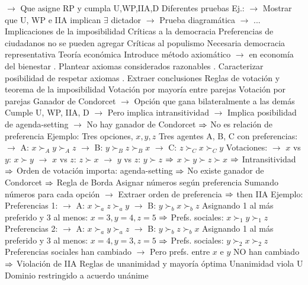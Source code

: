 \documentclass{nuevotema}
\begin{document}
\begin{esquemal}
				\4[] $\to$ Que asigne RP y cumpla U,WP,IIA,D
				\4 Diferentes pruebas
				\4[] Ej.:
				\4[] $\to$ Mostrar que U, WP e IIA implican $\exists$ dictador
				\4[] $\to$ Prueba diagramática
				\4[] $\to$ ...
			\3 Implicaciones de la imposibilidad
				\4 Críticas a la democracia
				\4[] Preferencias de ciudadanos no se pueden agregar
				\4 Críticas al populismo
				\4[] Necesaria democracia representativa
				\4 Teoría económica
				\4[] Introduce método axiomático
				\4[] $\to$ en economía del bienestar
				. Plantear axiomas considerados razonables
				. Caracterizar posibilidad de respetar axiomas
				. Extraer conclusiones
		\2 Reglas de votación y teorema de la imposibilidad
			\3 Votación por mayoría entre parejas
				\4 Votación por parejas
				\4[] Ganador de Condorcet
				\4[] $\to$ Opción que gana bilateralmente a las demás
				\4[] Cumple U, WP, IIA, D
				\4[] $\to$ Pero implica intransitividad
				\4[] $\to$ Implica posibilidad de agenda-setting
				\4[] $\to$ No hay ganador de Condorcet
				\4[] $\Rightarrow$ No es relación de preferencia
				\4 Ejemplo:
				\4[] Tres opciones, $x, y, z$
				\4[] Tres agentes A, B, C con preferencias:
				\4[] $\to$ A: $x \succ_A y \succ_A z$
				\4[] $\to$ B: $y \succ_B z \succ_B x$
				\4[] $\to$ C: $z \succ_C x \succ_C y$
				\4[] Votaciones:
				\4[] $\to$ $x$ vs $y$: $x \succ y$
				\4[] $\to$ $x$ vs $z$: $z \succ x$
				\4[] $\to$ $y$ vs $z$: $y \succ z$
				\4[] $\Rightarrow$ $x \succ y \succ z \succ x$
				\4[] $\Rightarrow$ Intransitividad
				\4[] $\Rightarrow$ Orden de votación importa: agenda-setting
				\4[] $\Rightarrow$ No existe ganador de Condorcet
				\4[] $\Rightarrow$ 
			\3 Regla de Borda
				\4 Asignar números según preferencia
				\4[] Sumando números para cada opción
				\4[] $\to$ Extraer orden de preferencia
				\4[] $\Rightarrow$ then IIA
				\4 Ejemplo:
				\4[] Preferencias 1:
				\4[] $\to$ A: $x \succ_a z \succ_a y$
				\4[] $\to$ B: $y \succ_b x \succ_b z$
				\4[] Asignando 1 al más preferido y 3 al menos:
				\4[] $x=3, y=4, z=5$
				\4[] $\Rightarrow$ Prefs. sociales: $x \succ_1 y \succ_1 z$
				\4[] Preferencias 2:
				\4[] $\to$ A: $x \succ_a y \succ_a z$
				\4[] $\to$ B: $y \succ_b z \succ_b x$
				\4[] Asignando 1 al más preferido y 3 al menos:
				\4[] $x=4, y=3, z=5$
				\4[] $\Rightarrow$ Prefs. sociales: $y \succ_2 x \succ_2 z$
				\4[] Preferencias sociales han cambiado
				\4[] $\to$ Pero prefs. entre $x$ e $y$ NO han cambiado
				\4[] $\Rightarrow$ Violación de IIA
			\3 Reglas de unanimidad y mayoría óptima
				\4 Unanimidad viola U
				\4[] Dominio restringido a acuerdo unánime

\end{esquemal}
\end{document}
